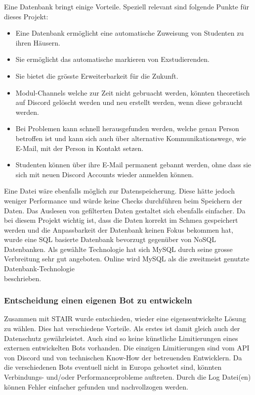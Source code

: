 \documentclass[a4paper, table]{article}
\begin{document}
Eine Datenbank bringt einige Vorteile.
Speziell relevant sind folgende Punkte für dieses Projekt:
\begin{itemize}
    \item Eine Datenbank ermöglicht eine automatische Zuweisung von Studenten zu ihren Häusern.
    \item Sie ermöglicht das automatische markieren von Exstudierenden.
    \item Sie bietet die grösste Erweiterbarkeit für die Zukunft.
    \item Modul-Channels welche zur Zeit nicht gebruacht werden, könnten theoretisch auf Discord gelöscht werden und neu erstellt werden, wenn diese gebraucht werden.
    \item Bei Problemen kann schnell herausgefunden werden, welche genau Person betroffen ist und kann sich auch über alternative Kommunikationswege, wie E-Mail, mit der Person in Kontakt setzen.
    \item Studenten können über ihre E-Mail permanent gebannt werden, ohne dass sie sich mit neuen Discord Accounts wieder anmelden können.
\end{itemize}

Eine Datei wäre ebenfalls möglich zur Datenspeicherung.
Diese hätte jedoch weniger Performance und würde keine Checks durchführen beim Speichern der Daten.
Das Auslesen von gefilterten Daten gestaltet sich ebenfalls einfacher.\autocite{castro_why_2020}
Da bei diesem Projekt wichtig ist, dass die Daten korrekt im Schmea gespeichert werden und die Anpassbarkeit der Datenbank keinen Fokus bekommen hat, wurde eine SQL basierte Datenbank bevorzugt gegenüber von NoSQL Datenbanken.
Als gewählte Technologie hat sich MySQL durch seine grosse Verbreitung sehr gut angeboten.
Online wird MySQL als die zweitmeist genutzte Datenbank-Technologie\\beschrieben.\autocite{noauthor_db-engines_2022}

\subsubsection*{Entscheidung einen eigenen Bot zu entwickeln}
Zusammen mit STAIR wurde entschieden, wieder eine eigensentwickelte Lösung zu wählen.
Dies hat verschiedene Vorteile.
Als erstes ist damit gleich auch der Datenschutz gewährleistet.
Auch sind so keine künstliche Limitierungen eines externen entwickelten Bots vorhanden.
Die einzigen Limitierungen sind vom API von Discord und von technischen Know-How der betreuenden Entwicklern.
Da die verschiedenen Bots eventuell nicht in Europa gehostet sind, könnten Verbindungs- und/oder Performanceprobleme auftreten.
Durch die Log Datei(en) können Fehler einfacher gefunden und nachvollzogen werden.
\newpage
\end{document}
